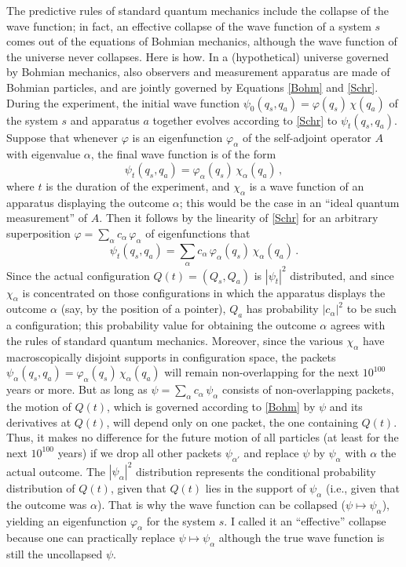 \documentclass[12pt]{article}
\newcommand{\be}{\begin{equation}}
\newcommand{\ee}{\end{equation}}
\begin{document}
The predictive rules of standard quantum mechanics include the collapse of the wave function; in fact, an effective collapse of the wave function of a system $s$ comes out of the equations of Bohmian mechanics, although the wave function of the universe never collapses. Here is how. In a (hypothetical) universe governed by Bohmian mechanics, also observers and measurement apparatus are made of Bohmian particles, and are jointly governed by Equations \eqref{Bohm} and \eqref{Schr}. During the experiment, the initial wave function $\psi_0(q_s,q_a)= \varphi(q_s)\,\chi(q_a)$ of the system $s$ and apparatus $a$ together evolves according to \eqref{Schr} to $\psi_t(q_s,q_a)$. Suppose that whenever $\varphi$ is an eigenfunction $\varphi_\alpha$ of the self-adjoint operator $A$ with eigenvalue $\alpha$, the final wave function is of the form
\be\label{eigenfunction}
\psi_t(q_s,q_a)=\varphi_\alpha(q_s)\, \chi_\alpha(q_a)\,,
\ee
where $t$ is the duration of the experiment, and $\chi_\alpha$ is a wave function of an apparatus displaying the outcome $\alpha$; this would be the case in an ``ideal quantum measurement'' of $A$. Then it follows by the linearity of \eqref{Schr} for an arbitrary superposition $\varphi=\sum_\alpha c_\alpha \, \varphi_\alpha$ of eigenfunctions that
\be\label{postmeasurement}
\psi_t(q_s,q_a) = \sum_\alpha c_\alpha\, \varphi_\alpha(q_s) \, \chi_\alpha(q_a)\,. 
\ee
Since the actual configuration $Q(t)=(Q_s,Q_a)$ is $|\psi_t|^2$ distributed, and since $\chi_\alpha$ is concentrated on those configurations in which the apparatus displays the outcome $\alpha$ (say, by the position of a pointer), $Q_a$ has probability $|c_\alpha|^2$ to be such a configuration; this probability value for obtaining the outcome $\alpha$ agrees with the rules of standard quantum mechanics. Moreover, since the various $\chi_\alpha$ have macroscopically disjoint supports in configuration space, the packets $\psi_\alpha(q_s,q_a)=\varphi_\alpha(q_s)\, \chi_\alpha(q_a)$ will remain non-overlapping for the next $10^{100}$ years or more. But as long as $\psi=\sum_\alpha c_\alpha \,\psi_\alpha$ consists of non-overlapping packets, the motion of $Q(t)$, which is governed according to \eqref{Bohm} by $\psi$ and its derivatives at $Q(t)$, will depend only on one packet, the one containing $Q(t)$. Thus, it makes no difference for the future motion of all particles (at least for the next $10^{100}$ years) if we drop all other packets $\psi_{\alpha'}$ and replace $\psi$ by $\psi_\alpha$ with $\alpha$ the actual outcome. The $|\psi_\alpha|^2$ distribution represents the conditional probability distribution of $Q(t)$, given that $Q(t)$ lies in the support of $\psi_\alpha$ (i.e., given that the outcome was $\alpha$). That is why the wave function can be collapsed ($\psi\mapsto\psi_\alpha$), yielding an eigenfunction $\varphi_\alpha$ for the system $s$. I called it an ``effective'' collapse because one can practically replace $\psi\mapsto \psi_\alpha$ although the true wave function is still the uncollapsed $\psi$.
\end{document}
